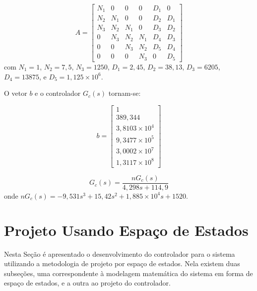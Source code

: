 \documentclass[journal,brazil,english]{IEEEtran}
\begin{document}
\begin{equation}\label{matrizA}
A = \begin{bmatrix}
 N_1 & 0 & 0 & 0 & D_1 & 0 \\ 
 N_2 & N_1 & 0 & 0 & D_2 & D_1 \\ 
 N_3 & N_2 & N_1 & 0 & D_3 & D_2 \\ 
 0 & N_3 & N_2 & N_1 & D_4 & D_3 \\
 0 & 0 & N_3 & N_2 & D_5 & D_4 \\
 0 & 0 & 0 & N_3 & 0 & D_5
\end{bmatrix}
\end{equation}
com $N_1=1$, $N_2=7,5$, $N_3=1250$, $D_1=2,45$, $D_2=38,13$, $D_3=6205$, $D_4=13875$, e $D_5=1,125\times10^6$.

O vetor $b$ e o controlador $G_c(s)$ tornam-se:

\begin{equation}\label{vetorb}
b = \begin{bmatrix}
 1 \\ 
 389,344 \\ 
 3,8103\times10^4 \\ 
 9,3477\times10^5 \\
 3,0002\times10^7 \\
 1,3117\times10^8
\end{bmatrix}
\end{equation}


\begin{equation}\label{gcs}
G_c(s) = \frac{nG_c(s)}{4,298 s + 114,9}
\end{equation}
onde $nG_c(s)=-9,531 s^3 + 15,42 s^2 + 1,885\times10^4 s + 1520$.

\section{Projeto Usando Espaço de Estados}\label{projetoespacoestados}
Nesta Seção é apresentado o desenvolvimento do controlador para o sistema utilizando a metodologia de projeto por espaço de estados. Nela existem duas subseções, uma correspondente à modelagem matemática do sistema em forma de espaço de estados, e a outra ao projeto do controlador.
\end{document}
